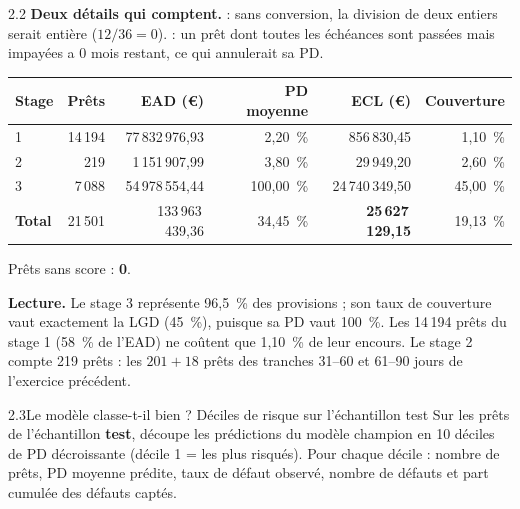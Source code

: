 \begin{correction}{2.2}
\textbf{Deux détails qui comptent.}  : sans conversion, la division de
deux entiers serait entière ($12/36 = 0$).  : un prêt dont toutes les
échéances sont passées mais impayées a 0 mois restant, ce qui annulerait sa PD.

\begin{resultat}
\begin{center}\small
\begin{tabular}{@{}lrrrrr@{}}
\toprule
Stage & Prêts & EAD (€) & PD moyenne & ECL (€) & Couverture \\
\midrule
1 & 14\,194 & 77\,832\,976,93 & 2,20~\% & 856\,830,45 & 1,10~\% \\
2 & 219 & 1\,151\,907,99 & 3,80~\% & 29\,949,20 & 2,60~\% \\
3 & 7\,088 & 54\,978\,554,44 & 100,00~\% & 24\,740\,349,50 & 45,00~\% \\
\textbf{Total} & 21\,501 & 133\,963\,439,36 & 34,45~\% & \textbf{25\,627\,129,15} & 19,13~\% \\
\bottomrule
\end{tabular}
\end{center}
Prêts sans score : \textbf{0}.
\end{resultat}

\textbf{Lecture.} Le stage 3 représente 96,5~\% des provisions ; son taux de couverture vaut exactement
la LGD (45~\%), puisque sa PD vaut 100~\%. Les 14\,194 prêts du stage 1 (58~\% de l'EAD) ne coûtent que
1,10~\% de leur encours. Le stage 2 compte 219 prêts : les $201 + 18$ prêts des tranches 31--60 et
61--90 jours de l'exercice précédent.
\end{correction}

\begin{exercice}{2.3}{Le modèle classe-t-il bien ? Déciles de risque sur l'échantillon test}
Sur les prêts de l'échantillon \textbf{test}, découpe les prédictions du modèle champion en 10 déciles
de PD décroissante (décile 1 = les plus risqués). Pour chaque décile : nombre de prêts, PD moyenne
prédite, taux de défaut observé, nombre de défauts et part cumulée des défauts captés.
\end{exercice}

